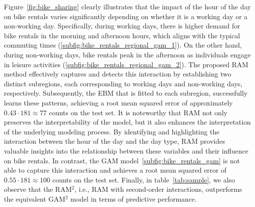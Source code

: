 \documentclass[runningheads]{llncs}
\begin{document}
Figure~\ref{fig:bike_sharing} clearly illustrates that the impact of the hour of the day on bike rentals varies
significantly depending on whether it is a working day or a non-working day.
Specifically, during working days, there is higher demand for bike rentals in the morning and afternoon hours,
which aligns with the typical commuting times (\ref{subfig:bike_rentals_regional_gam_1}).
On the other hand, during non-working days, bike rentals peak in the afternoon as individuals engage in
leisure activities (\ref{subfig:bike_rentals_regional_gam_2}).
The proposed RAM method effectively captures and detects this interaction by establishing two distinct subregions,
each corresponding to working days and non-working days, respectively.
Subsequently, the EBM that is fitted to each subregion, successfully learns these patterns,
achieving a root mean squared error of approximately \( 0.43 \cdot 181 \approx 77\) counts on the test set.
It is noteworthy that RAM not only preserves the interpretability of the model,
but it also enhances the interpretation of the underlying modeling process.
By identifying and highlighting the interaction between the hour of the day and the day type,
RAM provides valuable insights into the relationship between these variables and their influence on bike rentals.
In contrast, the GAM model~\ref{subfig:bike_rentals_gam} is not able to capture this interaction and
achieves a root mean squared error of \( 0.55 \cdot 181 \approx 100\) counts on the test set.
Finally, in table~\ref{tab:sample}, we also observe that the RAM$^2$, i.e., RAM with second-order interactions,
outperforms the equivalent GAM$^2$ model in terms of predictive performance.
\end{document}
